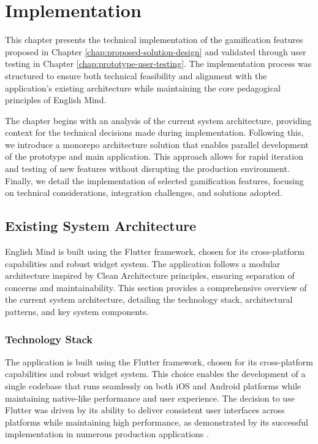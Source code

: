 \chapter{Implementation}
\label{chap:implementation}

This chapter presents the technical implementation of the gamification features proposed in Chapter \ref{chap:proposed-solution-design} and validated through user testing in Chapter \ref{chap:prototype-user-testing}. The implementation process was structured to ensure both technical feasibility and alignment with the application's existing architecture while maintaining the core pedagogical principles of English Mind.

The chapter begins with an analysis of the current system architecture, providing context for the technical decisions made during implementation. Following this, we introduce a monorepo architecture solution that enables parallel development of the prototype and main application. This approach allows for rapid iteration and testing of new features without disrupting the production environment. Finally, we detail the implementation of selected gamification features, focusing on technical considerations, integration challenges, and solutions adopted.

\section{Existing System Architecture}
\label{sec:existing-system-architecture}

English Mind is built using the Flutter framework, chosen for its cross-platform capabilities and robust widget system. The application follows a modular architecture inspired by Clean Architecture principles, ensuring separation of concerns and maintainability. This section provides a comprehensive overview of the current system architecture, detailing the technology stack, architectural patterns, and key system components.
\newpage
\subsection{Technology Stack}

The application is built using the Flutter framework, chosen for its cross-platform capabilities and robust widget system. This choice enables the development of a single codebase that runs seamlessly on both iOS and Android platforms while maintaining native-like performance and user experience. The decision to use Flutter was driven by its ability to deliver consistent user interfaces across platforms while maintaining high performance, as demonstrated by its successful implementation in numerous production applications \cite{cite:google_flutter_case_studies}.

